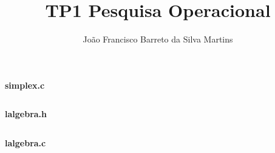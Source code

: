 \documentclass[6pt]{article}
\title{TP1 Pesquisa Operacional}
\author{João Francisco Barreto da Silva Martins}
\begin{document}
\maketitle

\textbf{simplex.c}
\inputminted[frame=lines,linenos,baselinestretch=1,fontsize=\footnotesize]{c++}{../simplex.c}
\textbf{lalgebra.h}
\inputminted[frame=lines,linenos,baselinestretch=1,fontsize=\footnotesize]{c++}{../lalgebra.h}
\textbf{lalgebra.c}
\inputminted[frame=lines,linenos,baselinestretch=1,fontsize=\footnotesize]{c++}{../lalgebra.c}
\end{document}
